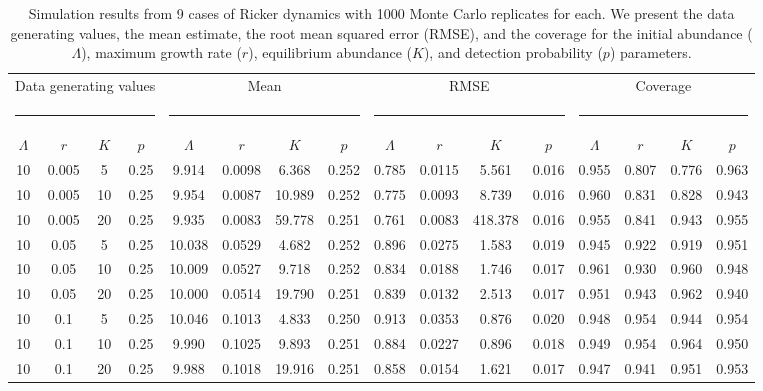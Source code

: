 \documentclass[12pt,english]{article}
\begin{document}
\begin{spacing}{1.9}
\begin{flushleft}
\begin{table}
  \centering
  \footnotesize
  \caption{Simulation results from 9 cases of Ricker dynamics with 1000 Monte Carlo replicates for each.
We present the data generating values, the mean estimate, the root mean squared error (RMSE), and the coverage
for the initial abundance ($\Lambda$), maximum growth rate ($r$), equilibrium abundance ($K$), 
and detection probability ($p$) parameters.}
  \begin{tabular}{cccccccccccccccc}
    \hline
    \multicolumn{4}{c}{Data generating values}&
    \multicolumn{4}{c}{Mean} &
    \multicolumn{4}{c}{RMSE} &
    \multicolumn{4}{c}{Coverage} \\
    \multicolumn{4}{c}{\rule{4cm}{1pt}} &
    \multicolumn{4}{c}{\rule{4cm}{1pt}} &
    \multicolumn{4}{c}{\rule{4cm}{1pt}} &
    \multicolumn{4}{c}{\rule{4cm}{1pt}} \\
    $\Lambda$ & $r$ & $K$ & $p$ & $\Lambda$ & $r$ & $K$ & $p$ & $\Lambda$ & $r$ & $K$ &
    $p$ & $\Lambda$ & $r$ & $K$ & $p$ \\
    \hline
10	&0.005	&5	&0.25	&9.914 &0.0098  &6.368 &0.252	&0.785 &0.0115  &5.561 &0.016	&0.955 &0.807 &0.776 &0.963\\
10	&0.005	&10	&0.25	&9.954 &0.0087 &10.989 &0.252 	&0.775 &0.0093  &8.739 &0.016  	&0.960 &0.831 &0.828 &0.943\\
10	&0.005	&20	&0.25	&9.935 &0.0083 &59.778 &0.251 	&0.761 &0.0083  &418.378 &0.016	&0.955 &0.841 &0.943 &0.955\\
10	&0.05	&5	&0.25	&10.038 &0.0529  &4.682 &0.252 	&0.896 &0.0275  &1.583 &0.019  	&0.945 &0.922 &0.919 &0.951\\
10	&0.05	&10	&0.25	&10.009 &0.0527  &9.718 &0.252 	&0.834 &0.0188  &1.746 &0.017  	&0.961 &0.930 &0.960 &0.948\\
10	&0.05	&20	&0.25	&10.000 &0.0514 &19.790 &0.251 &0.839 &0.0132  &2.513 &0.017  	&0.951 &0.943 &0.962 &0.940\\
10	&0.1	&5	&0.25	&10.046 &0.1013  &4.833 &0.250 	&0.913 &0.0353  &0.876 &0.020  	&0.948 &0.954 &0.944 &0.954\\
10	&0.1	&10	&0.25	&9.990 &0.1025  &9.893 &0.251 	&0.884 &0.0227  &0.896 &0.018  	&0.949 &0.954 &0.964 &0.950\\
10	&0.1	&20	&0.25	&9.988 &0.1018 &19.916 &0.251 	&0.858 &0.0154  &1.621 &0.017	&0.947 &0.941 &0.951 &0.953\\
  \hline
  \end{tabular}
  \label{tab:simricker}
\end{table}


\end{flushleft}
\end{spacing}
\end{document}
